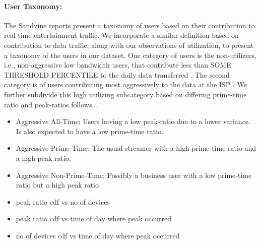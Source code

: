 \paragraph{User Taxonomy:} The Sandvine reports present a taxonomy of users based on their contribution to real-time entertainment traffic. We incorporate a similar definition based on contribution to data traffic, along with our observations of utilization, to present a taxonomy of the users in our dataset. One category of users is the non-utilizers, i.e., non-aggressive low bandwidth users, that contribute less than SOME THRESHOLD PERCENTILE to the daily data transferred . The second category is of users contributing most aggressively to the data at the ISP . We further subdivide this high utilizing subcategory based on differing prime-time ratio and peak-ratios follows... 
\begin{itemize}
\item Aggressive All-Time: Users having a low peak-ratio due to a lower variance. Is also expected to have a low prime-time ratio.
\item Aggressive Prime-Time: The usual streamer with a high prime-time ratio and a high peak ratio.
\item Aggressive Non-Prime-Time: Possibly a business user with a low prime-time ratio  but a high peak ratio
\end{itemize}


\begin{itemize}
\itemsep0em
\item peak ratio cdf vs no of devices
\item peak ratio cdf vs time of day where peak occurred
\item no of devices cdf vs time of day where peak occurred
\end{itemize}

